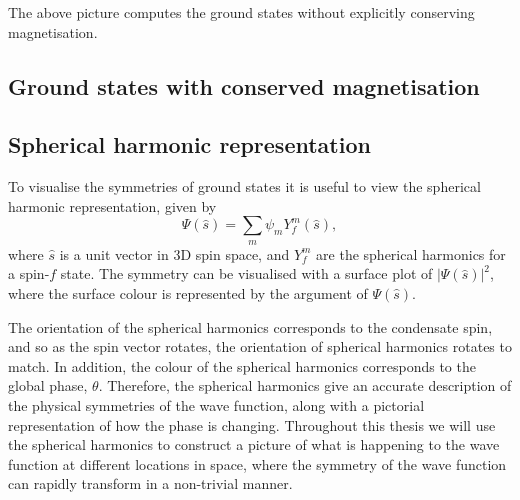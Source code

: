The above picture computes the ground states without explicitly conserving
magnetisation.
\subsection{Ground states with conserved magnetisation}

\subsection{Spherical harmonic representation}
To visualise the symmetries of ground states it is useful to view the spherical
harmonic representation, given by
\begin{equation}
    \Psi(\hat{s}) = \sum_m\psi_m Y_f^m(\hat{s}),
\end{equation}
where \(\hat{s}\) is a unit vector in 3D spin space, and \(Y_f^m \) are the
spherical harmonics for a spin-\(f\) state.
The symmetry can be visualised with a surface plot of \(|\Psi(\hat{s})|^2\),
where the surface colour is represented by the argument of \(\Psi(\hat{s})\).

The orientation of the spherical harmonics corresponds to the condensate spin,
and so as the spin vector rotates, the orientation of spherical harmonics
rotates to match.
In addition, the colour of the spherical harmonics corresponds to the global
phase, \( \theta \).
Therefore, the spherical harmonics give an accurate description of the
physical symmetries of the wave function, along with a pictorial representation
of how the phase is changing.
Throughout this thesis we will use the spherical harmonics to construct a
picture of what is happening to the wave function at different locations in
space, where the symmetry of the wave function can rapidly transform in a
non-trivial manner.

